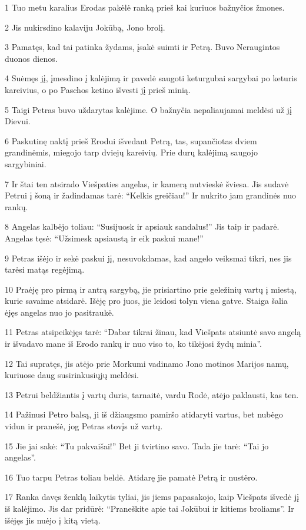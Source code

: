 \par 1 Tuo metu karalius Erodas pakėlė ranką prieš kai kuriuos bažnyčios žmones. 
\par 2 Jis nukirsdino kalaviju Jokūbą, Jono brolį. 
\par 3 Pamatęs, kad tai patinka žydams, įsakė suimti ir Petrą. Buvo Neraugintos duonos dienos. 
\par 4 Suėmęs jį, įmesdino į kalėjimą ir pavedė saugoti keturgubai sargybai po keturis kareivius, o po Paschos ketino išvesti jį prieš minią. 
\par 5 Taigi Petras buvo uždarytas kalėjime. O bažnyčia nepaliaujamai meldėsi už jį Dievui. 
\par 6 Paskutinę naktį prieš Erodui išvedant Petrą, tas, supančiotas dviem grandinėmis, miegojo tarp dviejų kareivių. Prie durų kalėjimą saugojo sargybiniai. 
\par 7 Ir štai ten atsirado Viešpaties angelas, ir kamerą nutvieskė šviesa. Jis sudavė Petrui į šoną ir žadindamas tarė: “Kelkis greičiau!” Ir nukrito jam grandinės nuo rankų. 
\par 8 Angelas kalbėjo toliau: “Susijuosk ir apsiauk sandalus!” Jis taip ir padarė. Angelas tęsė: “Užsimesk apsiaustą ir eik paskui mane!” 
\par 9 Petras išėjo ir sekė paskui jį, nesuvokdamas, kad angelo veiksmai tikri, nes jis tarėsi matąs regėjimą. 
\par 10 Praėję pro pirmą ir antrą sargybą, jie prisiartino prie geležinių vartų į miestą, kurie savaime atsidarė. Išėję pro juos, jie leidosi tolyn viena gatve. Staiga šalia ėjęs angelas nuo jo pasitraukė. 
\par 11 Petras atsipeikėjęs tarė: “Dabar tikrai žinau, kad Viešpats atsiuntė savo angelą ir išvadavo mane iš Erodo rankų ir nuo viso to, ko tikėjosi žydų minia”. 
\par 12 Tai supratęs, jis atėjo prie Morkumi vadinamo Jono motinos Marijos namų, kuriuose daug susirinkusiųjų meldėsi. 
\par 13 Petrui beldžiantis į vartų duris, tarnaitė, vardu Rodė, atėjo paklausti, kas ten. 
\par 14 Pažinusi Petro balsą, ji iš džiaugsmo pamiršo atidaryti vartus, bet nubėgo vidun ir pranešė, jog Petras stovįs už vartų. 
\par 15 Jie jai sakė: “Tu pakvaišai!” Bet ji tvirtino savo. Tada jie tarė: “Tai jo angelas”. 
\par 16 Tuo tarpu Petras toliau beldė. Atidarę jie pamatė Petrą ir nustėro. 
\par 17 Ranka davęs ženklą laikytis tyliai, jis jiems papasakojo, kaip Viešpats išvedė jį iš kalėjimo. Jis dar pridūrė: “Praneškite apie tai Jokūbui ir kitiems broliams”. Ir išėjęs jis nuėjo į kitą vietą. 
